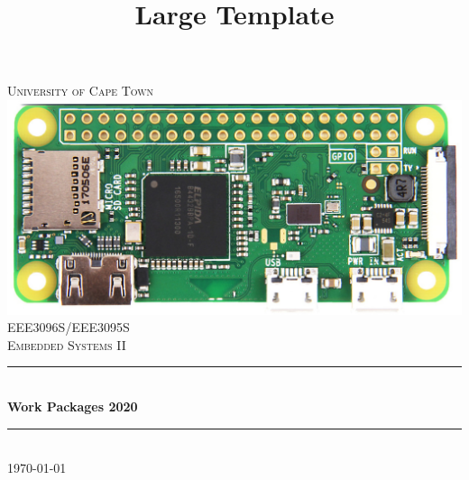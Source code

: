 \title{Large Template}


\begin{titlepage}
	\centering
	\textsc{\LARGE University of Cape Town}\\[0.5 cm]	%
	\vfill
	\includegraphics{Figures/Pi0W.jpg}\\[1 cm]	%
	\vfill
	\textsc{\LARGE EEE3096S/EEE3095S}\\[0.5 cm]				%
	\textsc{\large Embedded Systems II}\\[0.5 cm]				%
	\rule{\linewidth}{0.2 mm} \\[0.4 cm]
	{ \huge \bfseries Work Packages  2020}\\
	\rule{\linewidth}{0.2 mm} \\[1.5 cm]
    \vfill
	{\large \today}\\
\end{titlepage}